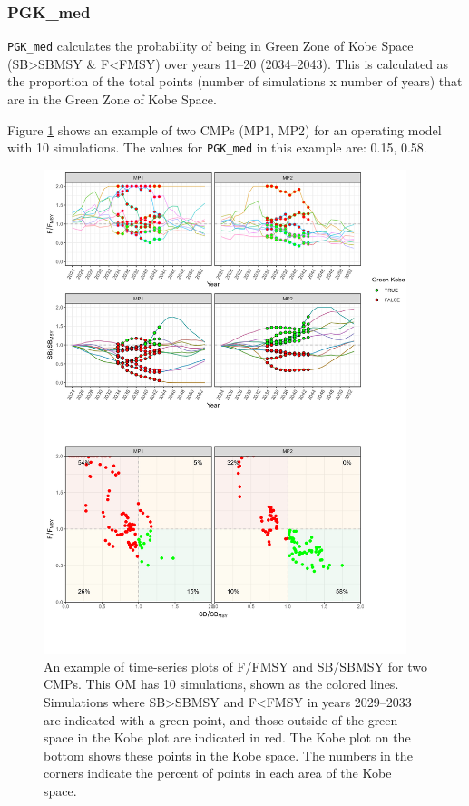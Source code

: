 \documentclass[
]{article}
\begin{document}
\hypertarget{pgk_med}{%
\subsubsection{PGK\_med}\label{pgk_med}}

\texttt{PGK\_med} calculates the probability of being in Green Zone of Kobe Space (SB\textgreater SBMSY \& F\textless FMSY) over years 11--20 (2034--2043). This is calculated as the proportion of the total points (number of simulations x number of years) that are in the Green Zone of Kobe Space.

Figure \ref{fig:PGKmed} shows an example of two CMPs (MP1, MP2) for an operating model with 10 simulations. The values for \texttt{PGK\_med} in this example are: 0.15, 0.58.

\begin{figure}
\includegraphics[width=400px]{../../img/PMs/PGK_med} \caption{An example of time-series plots of F/FMSY and SB/SBMSY for two CMPs. This OM has 10 simulations, shown as the colored lines. Simulations where SB>SBMSY and F<FMSY in years 2029--2033 are indicated with a green point, and those outside of the green space in the Kobe plot are indicated in red. The Kobe plot on the bottom shows these points in the Kobe space. The numbers in the corners indicate the percent of points in each area of the Kobe space.}\label{fig:PGKmed}
\end{figure}
\end{document}
